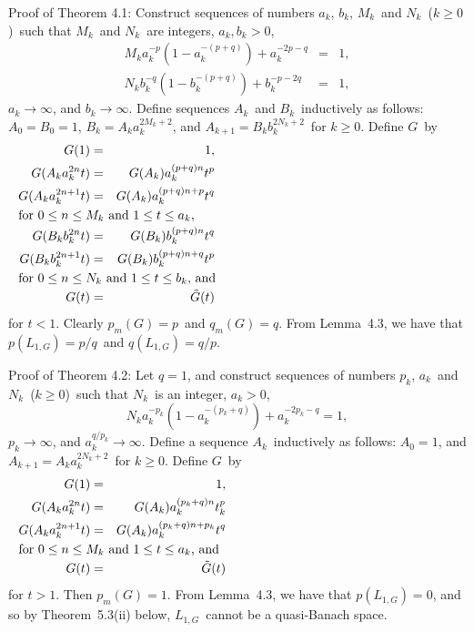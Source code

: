 \noindent
Proof of Theorem 4.1:  Construct sequences of numbers $a_k$, $b_k$, $M_k$\ 
and
$N_k$\ ($k\ge 0$)\ such that $M_k$\ and $N_k$\ are integers, $a_k,b_k>0$,
\begin{eqnarray*}
   M_k a_k^{-p}\left(1-a_k^{-(p+q)}\right) + a_k^{-2p-q} &=& 1 ,\\
   N_k b_k^{-q}\left(1-b_k^{-(p+q)}\right) + b_k^{-p-2q} &=& 1 ,
\end{eqnarray*}
$a_k \to \infty$, and $b_k\to\infty$. Define sequences $A_k$\ and $B_k$\
inductively as follows: $A_0 = B_0 = 1$, $B_k = A_k a_k^{2M_k+2}$, and 
$A_{k+1}
= B_k b_k^{2N_k+2}$\ for $k\ge0$. Define $G$\ by
\begin{eqnarray*}
   G(1) &=& 1 ,\\
   G(A_k a_k^{2n}t) 
   &=& G(A_k) a_k^{(p+q)n} t^p \\
   G(A_k a_k^{2n+1}t) 
   &=& G(A_k) a_k^{(p+q)n+p} t^q \\
\noalign{\noindent for $0\le n\le M_k$\ and $1\le t\le a_k$,}
   G(B_k b_k^{2n}t) 
   &=& G(B_k) b_k^{(p+q)n} t^q \\
   G(B_k b_k^{2n+1}t) 
   &=& G(B_k) b_k^{(p+q)n+q} t^p \\
\noalign{\noindent for $0\le n\le N_k$\ and $1\le t\le b_k$, and}
   G(t) &=& \tilde G(t) 
\end{eqnarray*}
for $t<1$. Clearly $p_m(G) = p$\ and $q_m(G) = q$. From Lemma~4.3, we have 
that
$p(L_{1,G}) = p/q$\ and $q(L_{1,G}) = q/p $.
\endproof

\noindent
Proof of Theorem 4.2: Let $q=1$, and construct sequences of numbers $p_k$, 
$a_k$\
and $N_k$\ ($k\ge 0$)\ such that $N_k$\ is an integer, $a_k>0$,
$$ N_k a_k^{-p_k}\left(1-a_k^{-(p_k+q)}\right) + a_k^{-2p_k-q} = 1 , $$
$p_k\to\infty$, and $a_k^{q/p_k} \to \infty$. Define a sequence $A_k$\
inductively as follows: $A_0 = 1$, and $A_{k+1} = A_k a_k^{2N_k+2}$\ for
$k\ge0$. Define $G$\ by 
\begin{eqnarray*}
   G(1) &=& 1 ,\\
   G(A_k a_k^{2n}t) 
   &=& G(A_k) a_k^{(p_k+q)n} t^p_k \\
   G(A_k a_k^{2n+1}t) 
   &=& G(A_k) a_k^{(p_k+q)n+p_k} t^q \\
\noalign{\noindent for $0\le n\le M_k$\ and $1\le t\le a_k$, and}
   G(t) &=& \tilde G(t) 
\end{eqnarray*}
for $t>1$.
Then $p_m(G) = 1$. From Lemma~4.3, we have that $p(L_{1,G})
= 0$, and so by Theorem~5.3(ii) below, $L_{1,G}$\ cannot be a quasi-Banach
space. 
\endproof

